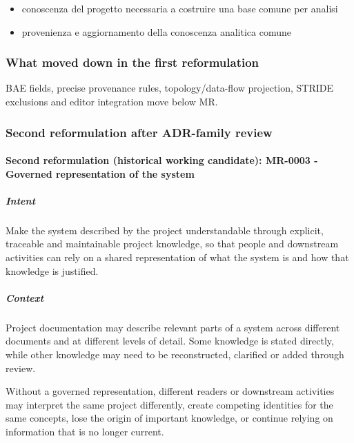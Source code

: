 \documentclass[
  10pt,
]{article}
\providecommand{\tightlist}{%
  \setlength{\itemsep}{0pt}\setlength{\parskip}{0pt}}
\begin{document}
\begin{itemize}
\tightlist
\item
  conoscenza del progetto necessaria a costruire una base comune per
  analisi
\item
  provenienza e aggiornamento della conoscenza analitica comune
\end{itemize}

\subsubsection{What moved down in the first
reformulation}\label{what-moved-down-in-the-first-reformulation}

BAE fields, precise provenance rules, topology/data-flow projection,
STRIDE exclusions and editor integration move below MR.

\subsubsection{Second reformulation after ADR-family
review}\label{second-reformulation-after-adr-family-review}

\paragraph{Second reformulation (historical working candidate): MR-0003
- Governed representation of the
system}\label{second-reformulation-historical-working-candidate-mr-0003---governed-representation-of-the-system}

\subparagraph{Intent}\label{intent-6}

Make the system described by the project understandable through
explicit, traceable and maintainable project knowledge, so that people
and downstream activities can rely on a shared representation of what
the system is and how that knowledge is justified.

\subparagraph{Context}\label{context-6}

Project documentation may describe relevant parts of a system across
different documents and at different levels of detail. Some knowledge is
stated directly, while other knowledge may need to be reconstructed,
clarified or added through review.

Without a governed representation, different readers or downstream
activities may interpret the same project differently, create competing
identities for the same concepts, lose the origin of important
knowledge, or continue relying on information that is no longer current.
\end{document}
